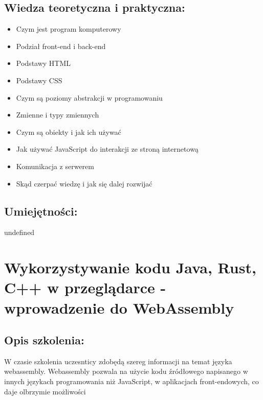 \documentclass{article}[10pt]
\begin{document}
	\subsection*{Wiedza teoretyczna i praktyczna:}
\begin{adjustwidth}{1.5cm}{}
	\begin{itemize}
		\item Czym jest program komputerowy
		\item Podział front-end i back-end
		\item Podstawy HTML
		\item Podstawy CSS
		\item Czym są poziomy abstrakcji w programowaniu
		\item Zmienne i typy zmiennych
		\item Czym są obiekty i jak ich używać
		\item Jak używać JavaScript do interakcji ze stroną internetową
		\item Komunikacja z serwerem
		\item Skąd czerpać wiedzę i jak się dalej  rozwijać
	\end{itemize}
\end{adjustwidth}

	\subsection*{Umiejętności:}
\begin{adjustwidth}{2cm}{}
\justifying
	undefined
\end{adjustwidth}

\newpage


    
	\section{Wykorzystywanie kodu Java, Rust, C++ w przeglądarce - wprowadzenie do WebAssembly}

	\subsection*{Opis szkolenia:}
	\begin{adjustwidth}{2cm}{}
\justifying
		W czasie szkolenia uczesnticy zdobędą szereg informacji na temat języka webassembly. Webassembly pozwala na użycie kodu źródłowego napisanego w innych językach programowania niż JavaScript, w aplikacjach front-endowych, co daje olbrzymie możliwości
	\end{adjustwidth}
\end{document}
